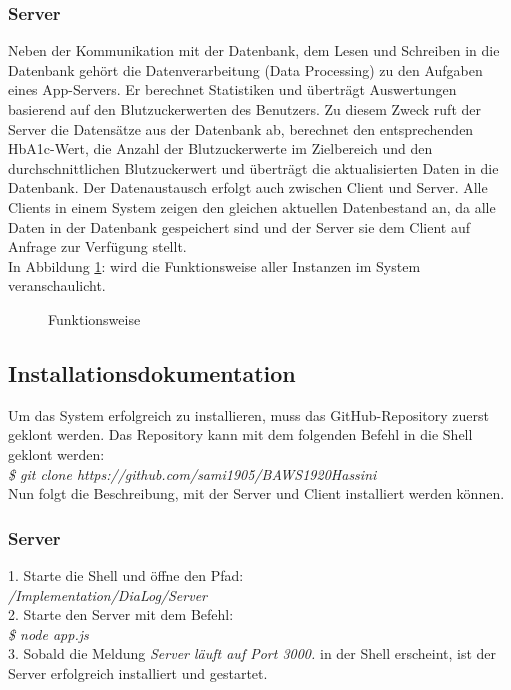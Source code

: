 	\subsubsection{Server}
	Neben der Kommunikation mit der Datenbank, dem Lesen und Schreiben in die Datenbank gehört die Datenverarbeitung (Data Processing) zu den Aufgaben eines App-Servers. Er berechnet Statistiken und überträgt Auswertungen basierend auf den Blutzuckerwerten des Benutzers. Zu diesem Zweck ruft der Server die Datensätze aus der Datenbank ab, berechnet den entsprechenden HbA1c-Wert, die Anzahl der Blutzuckerwerte im Zielbereich und den durchschnittlichen Blutzuckerwert und überträgt die aktualisierten Daten in die Datenbank.\newline
	Der Datenaustausch erfolgt auch zwischen Client und Server. Alle Clients in einem System zeigen den gleichen aktuellen Datenbestand an, da alle Daten in der Datenbank gespeichert sind und der Server sie dem Client auf Anfrage zur Verfügung stellt.
	 $~$ \\
	 In Abbildung \ref{img:funktionsweise}: \glqq {}\grqq{} wird die Funktionsweise aller Instanzen im System veranschaulicht.
	 \begin{figure}[H]
	 \centering
	 \setlength{\fboxsep}{1pt}
	 \setlength{\fboxrule}{1pt}
	 \captionsetup{justification=centering}
	 \caption{Funktionsweise}
	 \label{img:funktionsweise}
	 \end{figure}
	 \subsection{Installationsdokumentation}
	 Um das System erfolgreich zu installieren, muss das GitHub-Repository zuerst geklont werden. Das Repository kann mit dem folgenden Befehl in die Shell geklont werden:\\	 
	 \textit{\$ git clone https://github.com/sami1905/BAWS1920Hassini}\\
	 Nun folgt die Beschreibung, mit der Server und Client installiert werden können.
	 \subsubsection{Server}
	 1. Starte die Shell und öffne den Pfad:\\
	 \textit{/Implementation/DiaLog/Server}\\
	 2. Starte den Server mit dem Befehl:\\
	 \textit{\$ node app.js}\\
	 3. Sobald die Meldung \textit{\glqq Server läuft auf Port 3000.\grqq{}} in der Shell erscheint, ist der Server erfolgreich installiert und gestartet.
